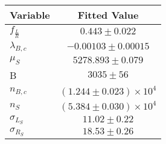 \begin{tabular}[t]{lc}
\hline
Variable &Fitted Value\\
\hline\hline
$f_{\frac{L}{R}}$&$0.443\pm0.022$\\
\hline
$\lambda_{B,c}$&$-0.00103\pm0.00015$\\
\hline
$\mu_S$&$5278.893\pm0.079$\\
\hline
B&$3035\pm56$\\
\hline
$n_{B,c}$&$(1.244\pm0.023)\times 10^4$\\
\hline
$n_S$&$(5.384\pm0.030)\times 10^4$\\
\hline
$\sigma_{L_S}$&$11.02\pm0.22$\\
\hline
$\sigma_{R_S}$&$18.53\pm0.26$\\
\hline
\end{tabular}
